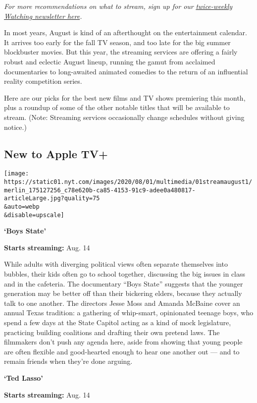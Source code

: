 \emph{For more recommendations on what to stream, sign up for our}
\href{https://www.nytimes.com/newsletters/watching}{\emph{twice-weekly
Watching newsletter here}}\emph{.}

In most years, August is kind of an afterthought on the entertainment
calendar. It arrives too early for the fall TV season, and too late for
the big summer blockbuster movies. But this year, the streaming services
are offering a fairly robust and eclectic August lineup, running the
gamut from acclaimed documentaries to long-awaited animated comedies to
the return of an influential reality competition series.

Here are our picks for the best new films and TV shows premiering this
month, plus a roundup of some of the other notable titles that will be
available to stream. (Note: Streaming services occasionally change
schedules without giving notice.)

\hypertarget{new-to-apple-tv}{%
\subsection{New to Apple TV+}\label{new-to-apple-tv}}

\texttt{[image: https://static01.nyt.com/images/2020/08/01/multimedia/01streamaugust1/merlin\_175127256\_c78e620b-ca85-4153-91c9-adee0a480817-articleLarge.jpg?quality=75\\\&auto=webp\\\&disable=upscale]}

\textbf{`Boys State'}

\textbf{Starts streaming:} Aug. 14

While adults with diverging political views often separate themselves
into bubbles, their kids often go to school together, discussing the big
issues in class and in the cafeteria. The documentary ``Boys State''
suggests that the younger generation may be better off than their
bickering elders, because they actually talk to one another. The
directors Jesse Moss and Amanda McBaine cover an annual Texas tradition:
a gathering of whip-smart, opinionated teenage boys, who spend a few
days at the State Capitol acting as a kind of mock legislature,
practicing building coalitions and drafting their own pretend laws. The
filmmakers don't push any agenda here, aside from showing that young
people are often flexible and good-hearted enough to hear one another
out --- and to remain friends when they're done arguing.

\textbf{`Ted Lasso'}

\textbf{Starts streaming:} Aug. 14


